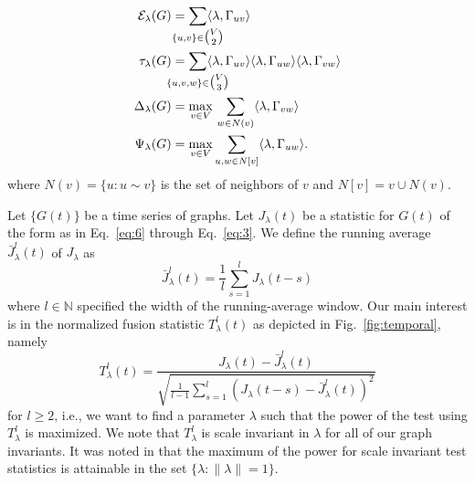 \documentclass[10pt,journal,compsoc]{IEEEtran}
\theoremstyle{definition}
\def\clap#1{\hbox to 0pt{\hss#1\hss}}
\def\mathclap{\mathpalette\mathclapinternal}
\def\mathclapinternal#1#2{%
\clap{$\mathsurround=0pt#1{#2}$}%
}
\begin{document}
\begin{align}
  \label{eq:6}
  \mathcal{E}_{\lambda}(G) &= \sum_{\mathclap{\{u,v\} \in
      \tbinom{V}{2}}} \langle
  \lambda, \Gamma_{uv} \rangle \\
  \tau_{\lambda}(G) &= \sum_{\mathclap{\{u,v,w\} \in \tbinom{V}{3}}} \langle
  \lambda, \Gamma_{uv} \rangle \langle \lambda,
  \Gamma_{uw} \rangle \langle \lambda, \Gamma_{vw}
  \rangle \\ 
\Delta_{\lambda}(G) &= \max_{v \in V} \, \sum_{w \in N(v)} \langle
\lambda, \Gamma_{vw} \rangle \\
\label{eq:3}
  \Psi_{\lambda}(G) &= \max_{v \in V} \sum_{u,w \in N[v]} \langle
  \lambda, \Gamma_{uw} \rangle.
  \end{align}
  where $N(v) = \{u \colon u \sim v\}$ is the set of neighbors of
  $v$ and $N[v] = v \cup N(v)$.  

  Let $\{G(t)\}$ be a time series of graphs. Let $J_{\lambda}(t)$ be a
  statistic for $G(t)$ of the form as in Eq.~\eqref{eq:6} through
  Eq.~\eqref{eq:3}. We define the running average 
  $\bar{J}^{l}_\lambda(t)$ of $J_{\lambda}$ as
\begin{equation}
  \label{eq:4}
 \bar{J}^{l}_{\lambda}(t) = \frac{1}{l}\sum_{s = 1}^{l} J_{\lambda}(t - s) 
\end{equation}
where $l \in \mathbb{N}$ specified the width of the running-average
window. Our main interest is in the normalized fusion statistic
$T_{\lambda}^{l}(t)$ as depicted in Fig.~\ref{fig:temporal}, namely
\begin{equation}
  \label{eq:7}
 T_{\lambda}^{l}(t) = %
   \frac{J_{\lambda}(t) -
     \bar{J}_{\lambda}^{l}(t)}{\sqrt{\tfrac{1}{l-1}
       \sum_{s=1}^{l}(J_{\lambda}(t - s) - \bar{J}_{\lambda}^{l}(t))^2}}
\end{equation}
for $l \geq 2$, i.e., we want to find a parameter $\lambda$ such that
the power of the test using $T_{\lambda}^{l}$ is maximized. We note that
$T_{\lambda}^{l}$ is scale invariant in $\lambda$ for all of our graph
invariants. It was noted in \cite{lee11} that the maximum of the power
for scale invariant test statistics is attainable in the set $\{ \lambda \colon \|
\lambda \| = 1 \}$. \\ \\
\end{document}
